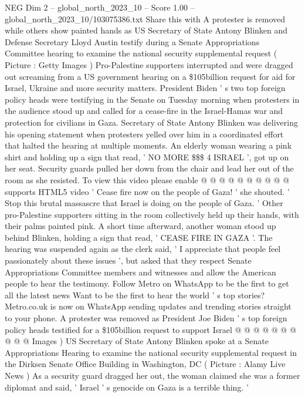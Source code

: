 \begin{textsample}{NEG Dim 2 – global\_north\_2023\_10 – Score 1.00 – global\_north\_2023\_10/103075386.txt}  \label{ex:f2_neg_161}
Share this with A protester is removed while others show painted hands as US Secretary of State Antony Blinken and Defense Secretary Lloyd Austin testify during a Senate Appropriations Committee hearing to examine the national security supplemental request ( Picture : Getty Images ) Pro-Palestine supporters interrupted and were dragged out screaming from a US government hearing on a \$105billion request for aid for Israel, Ukraine and more security matters.
President Biden ' s two top foreign policy heads were testifying in the Senate on Tuesday morning when protesters in the audience stood up and called for a cease-fire in the Israel-Hamas war and protection for civilians in Gaza.
Secretary of State Antony Blinken was delivering his opening statement when protesters yelled over him in a coordinated effort that halted the hearing at multiple moments.
An elderly woman wearing a pink shirt and holding up a sign that read, ' NO MORE \$\$\$ 4 ISRAEL ', got up on her seat.
Security guards pulled her down from the chair and lead her out of the room as she resisted.
To view this video please enable @ @ @ @ @ @ @ @ @ @ supports HTML5 video ' Cease fire now on the people of Gaza! ' she shouted. ' Stop this brutal massascre that Israel is doing on the people of Gaza. ' Other pro-Palestine supporters sitting in the room collectively held up their hands, with their palms painted pink.
A short time afterward, another woman stood up behind Blinken, holding a sign that read, ' CEASE FIRE IN GAZA '.
The hearing was suspended again as the clerk said, ' I appreciate that people feel passionately about these issues ', but asked that they respect Senate Appropriations Committee members and witnesses and allow the American people to hear the testimony.
Follow Metro on WhatsApp to be the first to get all the latest news Want to be the first to hear the world ' s top stories?
Metro.co.uk is now on WhatsApp sending updates and trending stories straight to your phone.
A protester was removed as President Joe Biden ' s top foreign policy heads testified for a \$105billion request to support Israel @ @ @ @ @ @ @ @ @ @ Images ) US Secretary of State Antony Blinken spoke at a Senate Appropriations Hearing to examine the national security supplemental request in the Dirksen Senate Office Building in Washington, DC ( Picture : Alamy Live News ) As a security guard dragged her out, the woman claimed she was a former diplomat and said, ' Israel ' s genocide on Gaza is a terrible thing. '

\end{textsample}
